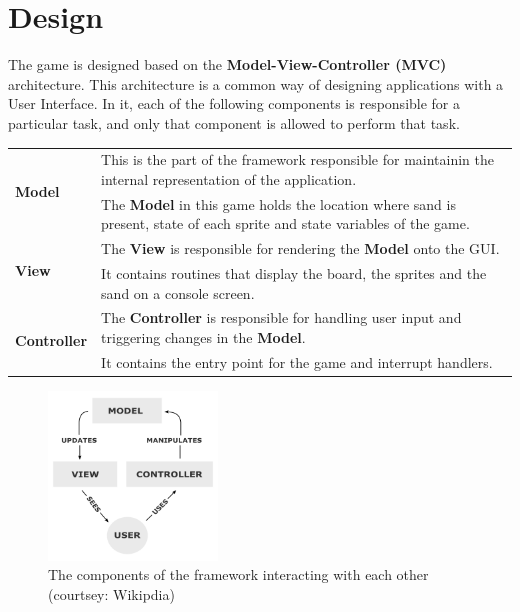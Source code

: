 \section{Design}

The game is designed based on the \textbf{Model-View-Controller (MVC)} architecture.
This architecture is a common way of designing applications with a User Interface.
In it, each of the following components is responsible for a particular task, and only that component is allowed to perform that task.

\begin{table}[H]
  \centering
  \bgroup
  \def\arraystretch{1.5}
  \begin{tabularx}{\textwidth}{|p{3cm}|X|}

    \hline
    \multirow{2}{*}{\textbf{Model}}  
      & This is the part of the framework responsible for maintainin the internal representation of the application.                            \\
      & The \textbf{Model} in this game holds the location where sand is present, state of each sprite and state variables of the game.         \\
    \hline

    \multirow{2}{*}{\textbf{View}}   
      & The \textbf{View} is responsible for rendering the \textbf{Model} onto the GUI.                                                         \\
      & It contains routines that display the board, the sprites and the sand on a console screen.                                              \\
    \hline

    \multirow{2}{*}{\textbf{Controller}} 
      & The \textbf{Controller} is responsible for handling user input and triggering changes in the \textbf{Model}.                            \\
      & It contains the entry point for the game and interrupt handlers.                                                                        \\
    \hline

  \end{tabularx}
  \egroup
\end{table}


\begin{figure}[H]
  \centering
  \includegraphics[width=0.4\textwidth]{images/mvc-process.png}
  \caption{\label{fig:mvc-process} The components of the framework interacting with each other (courtsey: Wikipdia)}
\end{figure}







